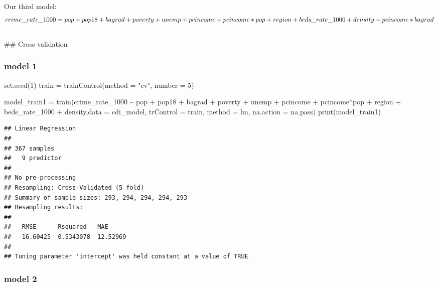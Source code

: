 \documentclass[
  11pt,
]{article}
\newenvironment{Shaded}{\begin{snugshade}}{\end{snugshade}}
\newcommand{\AttributeTok}[1]{\textcolor[rgb]{0.77,0.63,0.00}{#1}}
\newcommand{\DecValTok}[1]{\textcolor[rgb]{0.00,0.00,0.81}{#1}}
\newcommand{\FunctionTok}[1]{\textcolor[rgb]{0.00,0.00,0.00}{#1}}
\newcommand{\NormalTok}[1]{#1}
\newcommand{\OtherTok}[1]{\textcolor[rgb]{0.56,0.35,0.01}{#1}}
\newcommand{\SpecialCharTok}[1]{\textcolor[rgb]{0.00,0.00,0.00}{#1}}
\newcommand{\StringTok}[1]{\textcolor[rgb]{0.31,0.60,0.02}{#1}}
\begin{document}
Our third model: \[crime\_rate\_1000 = pop + pop18 + bagrad +
                  poverty + unemp + pcincome + \\ pcincome*pop + region +
                  beds\_rate\_1000 + density +
                  pcincome*bagrad\]\\
\#\# Cross validation

\hypertarget{model-1}{%
\subsubsection{model 1}\label{model-1}}

\begin{Shaded}
\begin{Highlighting}[]
\FunctionTok{set.seed}\NormalTok{(}\DecValTok{1}\NormalTok{)}
\NormalTok{train }\OtherTok{=} \FunctionTok{trainControl}\NormalTok{(}\AttributeTok{method =} \StringTok{"cv"}\NormalTok{, }\AttributeTok{number =} \DecValTok{5}\NormalTok{)}

\NormalTok{model\_train1 }\OtherTok{=} \FunctionTok{train}\NormalTok{(crime\_rate\_1000 }\SpecialCharTok{\textasciitilde{}}  
\NormalTok{                  pop }\SpecialCharTok{+}\NormalTok{ pop18 }\SpecialCharTok{+}\NormalTok{ bagrad }\SpecialCharTok{+}
\NormalTok{                  poverty }\SpecialCharTok{+}\NormalTok{ unemp }\SpecialCharTok{+}\NormalTok{ pcincome }\SpecialCharTok{+}\NormalTok{ pcincome}\SpecialCharTok{*}\NormalTok{pop }\SpecialCharTok{+}\NormalTok{ region }\SpecialCharTok{+}
\NormalTok{                  beds\_rate\_1000 }\SpecialCharTok{+}\NormalTok{ density,}\AttributeTok{data =}\NormalTok{ cdi\_model,}
                   \AttributeTok{trControl =}\NormalTok{ train,}
                   \AttributeTok{method =} \StringTok{\textquotesingle{}lm\textquotesingle{}}\NormalTok{,}
                   \AttributeTok{na.action =}\NormalTok{ na.pass)}
\FunctionTok{print}\NormalTok{(model\_train1)}
\end{Highlighting}
\end{Shaded}

\begin{verbatim}
## Linear Regression 
## 
## 367 samples
##   9 predictor
## 
## No pre-processing
## Resampling: Cross-Validated (5 fold) 
## Summary of sample sizes: 293, 294, 294, 294, 293 
## Resampling results:
## 
##   RMSE      Rsquared   MAE     
##   16.60425  0.5343078  12.52969
## 
## Tuning parameter 'intercept' was held constant at a value of TRUE
\end{verbatim}

\hypertarget{model-2}{%
\subsubsection{model 2}\label{model-2}}
\end{document}
